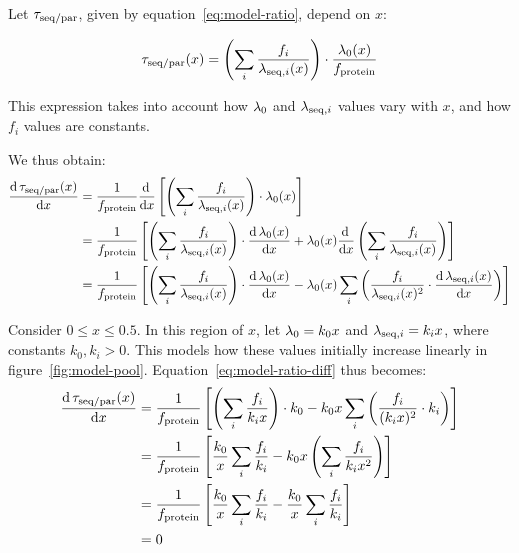 Let $\tau_{\mathrm{seq}/\mathrm{par}}$, given by equation~\ref{eq:model-ratio}, depend on $x$:

\begin{equation}
  \label{eq:model-ratio-x}
  \tau_{\mathrm{seq}/\mathrm{par}}(x) = \left( \sum_i \frac{f_i}{\lambda_{\mathrm{seq},i}(x)} \right) \cdot \frac{\lambda_{0}(x)}{f_{\mathrm{protein}}}
\end{equation}

This expression takes into account how $\lambda_{0}$ and $\lambda_{\mathrm{seq},i}$ values vary with $x$, and how $f_{i}$ values are constants.

We thus obtain:
\begin{equation}
  \begin{aligned}
  \frac{\mathrm{d} \, \tau_{\mathrm{seq}/\mathrm{par}}(x)}{\mathrm{d} x} &= \frac{1}{f_{\mathrm{protein}}} \frac{\mathrm{d} \, }{\mathrm{d} x} \left[ \left( \sum_i \frac{f_i}{\lambda_{\mathrm{seq},i}(x)} \right) \cdot \lambda_{0}(x) \right]\\
  &= \frac{1}{f_{\mathrm{protein}}} \left[ \left( \sum_i \frac{f_i}{\lambda_{\mathrm{seq},i}(x)} \right) \cdot \frac{\mathrm{d} \, \lambda_{0}(x)}{\mathrm{d} x} + \lambda_{0}(x) \frac{\mathrm{d} \, }{\mathrm{d} x} \left( \sum_i \frac{f_i}{\lambda_{\mathrm{seq},i}(x)} \right) \right]\\
  &= \frac{1}{f_{\mathrm{protein}}} \left[ \left( \sum_i \frac{f_i}{\lambda_{\mathrm{seq},i}(x)} \right) \cdot \frac{\mathrm{d} \, \lambda_{0}(x)}{\mathrm{d} x} - \lambda_{0}(x) \sum_{i}\left( \frac{f_{i}}{\lambda_{\mathrm{seq},i}(x)^{2}} \cdot \frac{\mathrm{d} \, \lambda_{\mathrm{seq},i}(x)}{\mathrm{d} x} \right) \right]
  \end{aligned}
  \label{eq:model-ratio-diff}
\end{equation}

Consider $0 \leq x \leq 0.5$.
In this region of $x$, let $\lambda_{0} = k_{0}x$ and $\lambda_{\mathrm{seq},i} = k_{i}x$, where constants $k_{0}, k_{i} > 0$.
This models how these values initially increase linearly in figure~\ref{fig:model-pool}.
Equation~\ref{eq:model-ratio-diff} thus becomes:
\begin{equation}
  \begin{aligned}
  \frac{\mathrm{d} \, \tau_{\mathrm{seq}/\mathrm{par}}(x)}{\mathrm{d} x} &= \frac{1}{f_{\mathrm{protein}}} \left[ \left( \sum_i \frac{f_i}{k_{i}x} \right) \cdot k_{0} - k_{0}x \sum_{i}\left( \frac{f_{i}}{(k_{i}x)^{2}} \cdot k_{i} \right) \right]\\
  &= \frac{1}{f_{\mathrm{protein}}} \left[ \frac{k_{0}}{x} \sum_i \frac{f_i}{k_{i}} - k_{0}x \left( \sum_{i} \frac{f_{i}}{k_{i}x^{2}} \right) \right]\\
  &= \frac{1}{f_{\mathrm{protein}}} \left[ \frac{k_{0}}{x} \sum_i \frac{f_i}{k_{i}} - \frac{k_{0}}{x} \sum_i \frac{f_i}{k_{i}} \right]\\
  &= 0
  \end{aligned}
  \label{eq:model-ratio-diff-smallx}
\end{equation}

